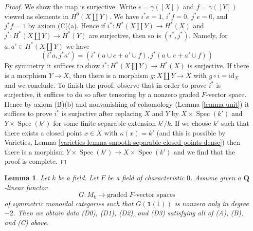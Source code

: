 \documentclass{stacks-project}
\theoremstyle{plain}
\newtheorem{lemma}[subsection]{Lemma}
\theoremstyle{definition}
\theoremstyle{remark}
\numberwithin{equation}{subsection}
\def\Spec{\mathop{\mathrm{Spec}}}
\begin{document}
\begin{proof}
\medskip\noindent
We show the map is surjective. Write $e = \gamma([X])$ and $f = \gamma([Y])$
viewed as elements in $H^0(X \amalg Y)$. We have
$i^*e = 1$, $i^*f = 0$, $j^*e = 0$, and $j^*f = 1$ by axiom (C)(a).
Hence if $i^* : H^*(X \amalg Y) \to  H^*(X)$
and $j^* : H^*(X \amalg Y) \to H^*(Y)$ are surjective, then
so is $(i^*, j^*)$. Namely, for $a, a' \in H^*(X \amalg Y)$
we have
$$
(i^*a, j^*a') = (i^*(a \cup e + a' \cup f), j^*(a \cup e + a' \cup f))
$$
By symmetry it suffices to show $i^* : H^*(X \amalg Y) \to  H^*(X)$
is surjective. If there is a morphism $Y \to X$, then there is a morphism
$g : X \amalg Y \to X$ with $g \circ i = \text{id}_X$ and we conclude.
To finish the proof, observe that in order to prove
$i^*$ is surjective, it suffices to do so after tensoring
by a nonzero graded $F$-vector space. Hence by axiom (B)(b)
and nonvanishing of cohomology (Lemma \ref{lemma-unit})
it suffices to prove $i^*$ is surjective after replacing
$X$ and $Y$ by $X \times \Spec(k')$ and $Y \times \Spec(k')$
for some finite separable extension $k'/k$.
If we choose $k'$ such that there exists a closed point
$x \in X$ with $\kappa(x) = k'$ (and this is possible by
Varieties, Lemma \ref{varieties-lemma-smooth-separable-closed-points-dense})
then there is a morphism $Y \times \Spec(k') \to X \times \Spec(k')$
and we find that the proof is complete.
\end{proof}

\begin{lemma}
\label{lemma-from-functor-to-weil}
Let $k$ be a field. Let $F$ be a field of characteristic $0$.
Assume given a $\mathbf{Q}$-linear functor
$$
G : M_k \longrightarrow \text{graded }F\text{-vector spaces}
$$
of symmetric monoidal categories such that $G(\mathbf{1}(1))$
is nonzero only in degree $-2$. Then we obtain data (D0), (D1), (D2), and (D3)
satisfying all of (A), (B), and (C) above.
\end{lemma}
\end{document}
